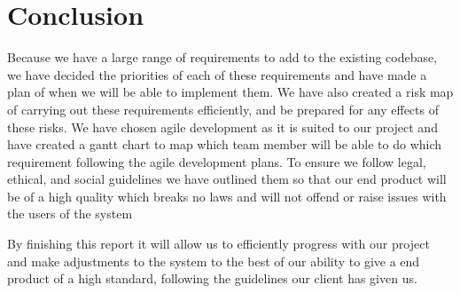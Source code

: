   \section{Conclusion}
Because we have a large range of requirements to add to the existing codebase, we have decided the priorities of each of these requirements and have made a plan of when we will be able to implement them. We have also created a risk map of carrying out these requirements efficiently, and be prepared for any effects of these risks. 
We have chosen agile development as it is suited to our project and have created a gantt chart to map which team member will be able to do which requirement following the agile development plans. 
To ensure we follow legal, ethical, and social guidelines we have outlined them so that our end product will be of a high quality which breaks no laws and will not offend or raise issues with the users of the system

By finishing this report it will allow us to efficiently progress with our project and make adjustments to the system to the best of our ability to give a end product of a high standard, following the guidelines our client has given us.


  
